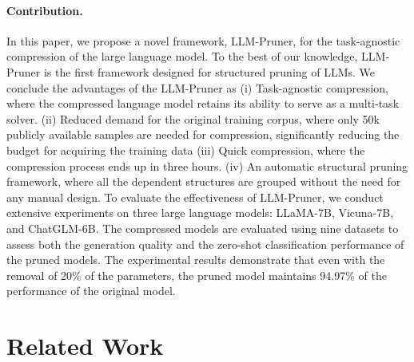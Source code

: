   
\iffalse{
In sum, our contributions can be summarized as follow:

\begin{itemize} [leftmargin=*]
    \setlength\itemsep{0.5em}
    \item We propose a novel framework, LLM-Pruner, for the task-agnostic compression of the large language model. The compressed language model preserves its ability to serve as a multi-task solver.
    \item With the limited availability of training corpus, we propose 
    \item We conduct extensive experiments to demonstrate the effectiveness of LLM-Pruner. The evaluation is performed on LLaMA-7B, Vicuna-7B and ChatGLM-6B with nine datasets to evaluate the generation quality and the zero-shot classification performance of the pruned model. Experiments show that with 20\% parameters removed, the model can maintain 93.6\% of the performance of the original model.
\end{itemize}
}\fi
\paragraph{Contribution.} In this paper,  we propose a novel framework, LLM-Pruner, for the task-agnostic compression of the large language model. To the best of our knowledge, LLM-Pruner is the first framework designed for structured pruning of LLMs. We conclude the advantages of the LLM-Pruner as (i) Task-agnostic compression, where the compressed language model retains its ability to serve as a multi-task solver. (ii) Reduced demand for the original training corpus, where only 50k publicly available samples are needed for compression, significantly reducing the budget for acquiring the training data (iii) Quick compression, where the compression process ends up in three hours. (iv) An automatic structural pruning framework, where all the dependent structures are grouped without the need for any manual design.
To evaluate the effectiveness of LLM-Pruner, we conduct extensive experiments on three large language models: LLaMA-7B, Vicuna-7B, and ChatGLM-6B. The compressed models are evaluated using nine datasets to assess both the generation quality and the zero-shot classification performance of the pruned models. The experimental results demonstrate that even with the removal of 20\% of the parameters, the pruned model maintains 94.97\% of the performance of the original model.

\section{Related Work}
